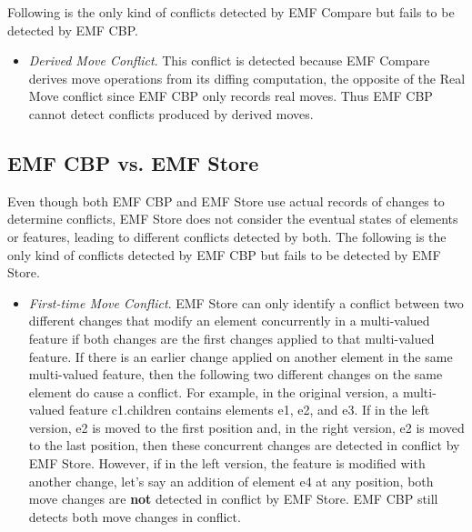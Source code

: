 Following is the only kind of conflicts detected by EMF Compare but fails to be detected by EMF CBP. 
\begin{itemize}
\item \emph{Derived Move Conflict}. This conflict is detected because EMF Compare derives move operations from its diffing computation, the opposite of the Real Move conflict since EMF CBP only records real moves. Thus EMF CBP cannot detect conflicts produced by derived moves.
\end{itemize}

\subsection{EMF CBP vs. EMF Store}
\label{sec:emf_cbp_vs_emf_store}
Even though both EMF CBP and EMF Store use actual records of changes to determine conflicts, EMF Store does not consider the eventual states of elements or features, leading to different conflicts detected by both. The following is the only kind of conflicts detected by EMF CBP but fails to be detected by EMF Store. 
\begin{itemize}
\item \emph{First-time Move Conflict}. EMF Store can only identify a conflict between two different changes that modify an element concurrently in a multi-valued feature if both changes are the first changes applied to that multi-valued feature. If there is an earlier change applied on another element in the same multi-valued feature, then the following two different changes on the same element do cause a conflict. For example, in the original version, a multi-valued feature \textsf{c1}.\textsf{children} contains elements \textsf{e1}, \textsf{e2}, and \textsf{e3}. If in the left version, \textsf{e2} is moved to the first position and, in the right version, \textsf{e2} is moved to the last position, then these concurrent changes are detected in conflict by EMF Store. However, if in the left version, the feature is modified with another change, let's say an addition of element \textsf{e4} at any position, both \textsf{move} changes are \textbf{not} detected in conflict by EMF Store. EMF CBP still detects both \textsf{move} changes in conflict.
\end{itemize}

